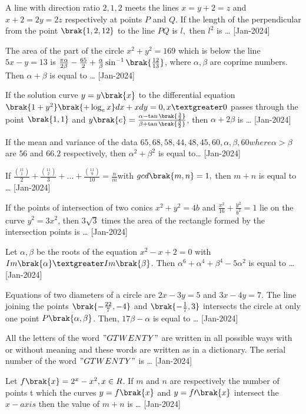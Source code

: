 \iffalse
\title{2024}
\author{EE24BTECH11021}
\section{integer}
\fi
    \item A line with direction ratio $2,1,2$ meets the lines $x=y+2=z$ and $x+2=2y=2z$ respectively at points $P$ and $Q$. If the length of the perpendicular from the point $\brak{1,2,12}$ to the line $PQ$ is $l,$ then $l^2$ is \dots
    \hfill{[Jan-2024]}
    \item The area  of the part of the circle $x^2+y^2=169$ which is below the line $5x-y=13$ is $\frac{\pi\alpha}{2\beta}-\frac{65}{2}+\frac{\alpha}{\beta}\sin^{-1}\brak{\frac{12}{13}}$, where $\alpha,\beta$ are coprime numbers. Then $\alpha+\beta$ is equal to \dots
    \hfill{[Jan-2024]}
    \item If the solution curve $y=y\brak{x}$ to the differential equation $\brak{1+y^2}\brak{+\log_{e}x}dx+x dy=0,x\textgreater 0$ passes through the point $\brak{1,1}$ and $y\brak{e}=\frac{\alpha-\tan\brak{\frac{3}{2}}}{\beta+\tan\brak{\frac{3}{2}}}$, then $\alpha+2\beta$ is \dots
    \hfill{[Jan-2024]}
    \item If the mean and variance of the data $65, 68, 58, 44, 48, 45, 60, \alpha, \beta, 60 where \alpha > \beta$ are $56$ and $66.2$ respectively, then $\alpha^2+\beta^2$ is equal to\dots
    \hfill{[Jan-2024]}
    \item If $\frac{\binom{11}{1}}{2}+\frac{\binom{11}{2}}{3}+\dots+\frac{\binom{11}{9}}{10}=\frac{n}{m}$with $gcd\brak{m,n}=1,$ then $m+n$ is equal to \dots 
    \hfill{[Jan-2024]}
    \item If the points of intersection of two conics $x^2+y^2=4b$ and $\frac{x^2}{16}+\frac{y^2}{b^2}=1$ lie on the curve $y^2=3x^2$, then $3\sqrt{3}$ times the area of the rectangle formed by the intersection points is \dots
    \hfill{[Jan-2024]}
    \item Let $\alpha,\beta$ be the roots of the equation $x^2-x+2=0$ with $Im\brak{\alpha}\textgreater Im\brak{\beta}$. Then $\alpha^6+\alpha^4+\beta^4-5\alpha^2$ is equal to \dots
    \hfill{[Jan-2024]}
    \item Equations of two diameters of a circle are $2x-3y=5$ and $3x-4y=7$. The line joining the points $\brak{-\frac{22}{7},-4}$ and $\brak{-\frac{1}{7},3}$ intersects the circle at only one point $P\brak{\alpha,\beta}$. Then, $17\beta-\alpha$ is equal to \dots
    \hfill{[Jan-2024]}
    \item All the letters of the word $"GTWENTY"$ are written in all possible ways with or without meaning and these words are written as in a dictionary. The serial number of the word $"GTWENTY"$ is \dots
    \hfill{[Jan-2024]}
    \item Let $f\brak{x}=2^x-x^2,x\in R$. If $m$ and $n$ are respectively the number of points t which the curves $y=f\brak{x}$ and $y=f\prime\brak{x}$ intersect the $x-axis$ then the value of $m+n$ is \dots
    \hfill{[Jan-2024]}
